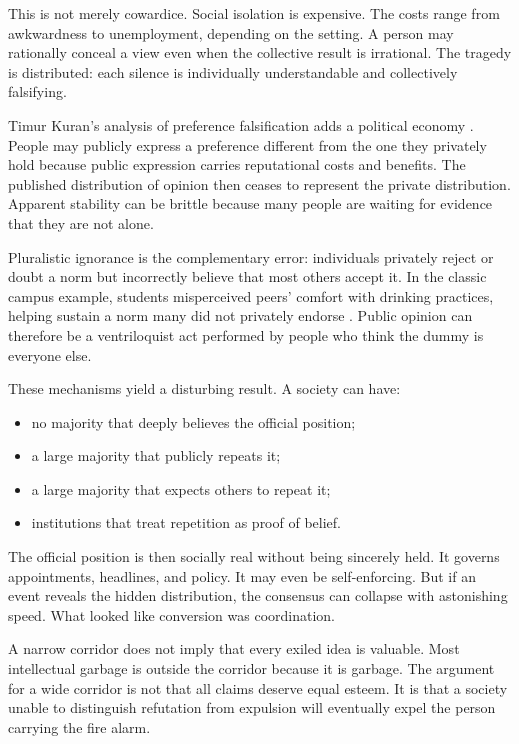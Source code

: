 ﻿\documentclass[12pt,a4paper]{book}
\begin{document}
This is not merely cowardice. Social isolation is expensive. The costs range from awkwardness to unemployment, depending on the setting. A person may rationally conceal a view even when the collective result is irrational. The tragedy is distributed: each silence is individually understandable and collectively falsifying.

Timur Kuran's analysis of preference falsification adds a political economy \cite{Kuran1995}. People may publicly express a preference different from the one they privately hold because public expression carries reputational costs and benefits. The published distribution of opinion then ceases to represent the private distribution. Apparent stability can be brittle because many people are waiting for evidence that they are not alone.

Pluralistic ignorance is the complementary error: individuals privately reject or doubt a norm but incorrectly believe that most others accept it. In the classic campus example, students misperceived peers' comfort with drinking practices, helping sustain a norm many did not privately endorse \cite{PrenticeMiller1993}. Public opinion can therefore be a ventriloquist act performed by people who think the dummy is everyone else.

These mechanisms yield a disturbing result. A society can have:

\begin{itemize}
  \item no majority that deeply believes the official position;
  \item a large majority that publicly repeats it;
  \item a large majority that expects others to repeat it;
  \item institutions that treat repetition as proof of belief.
\end{itemize}

The official position is then socially real without being sincerely held. It governs appointments, headlines, and policy. It may even be self-enforcing. But if an event reveals the hidden distribution, the consensus can collapse with astonishing speed. What looked like conversion was coordination.

A narrow corridor does not imply that every exiled idea is valuable. Most intellectual garbage is outside the corridor because it is garbage. The argument for a wide corridor is not that all claims deserve equal esteem. It is that a society unable to distinguish refutation from expulsion will eventually expel the person carrying the fire alarm.
\end{document}
